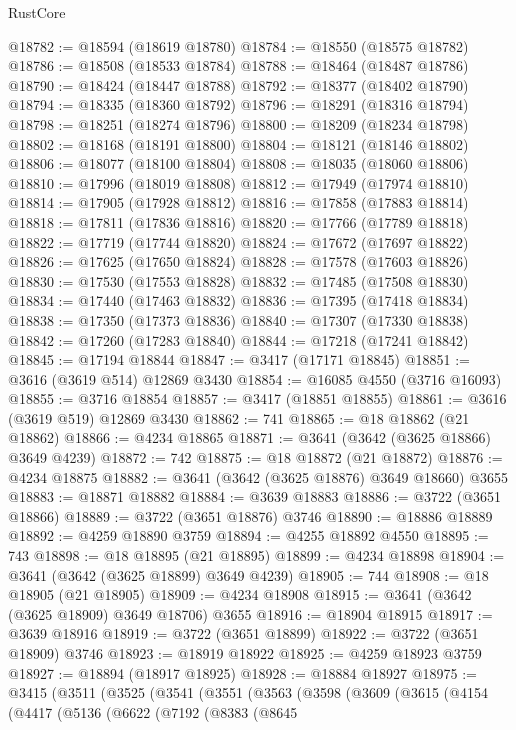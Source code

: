 \begin{lexlean}{RustCore}
\begin{coremodule}
@18782 := @18594 (@18619 @18780)
@18784 := @18550 (@18575 @18782)
@18786 := @18508 (@18533 @18784)
@18788 := @18464 (@18487 @18786)
@18790 := @18424 (@18447 @18788)
@18792 := @18377 (@18402 @18790)
@18794 := @18335 (@18360 @18792)
@18796 := @18291 (@18316 @18794)
@18798 := @18251 (@18274 @18796)
@18800 := @18209 (@18234 @18798)
@18802 := @18168 (@18191 @18800)
@18804 := @18121 (@18146 @18802)
@18806 := @18077 (@18100 @18804)
@18808 := @18035 (@18060 @18806)
@18810 := @17996 (@18019 @18808)
@18812 := @17949 (@17974 @18810)
@18814 := @17905 (@17928 @18812)
@18816 := @17858 (@17883 @18814)
@18818 := @17811 (@17836 @18816)
@18820 := @17766 (@17789 @18818)
@18822 := @17719 (@17744 @18820)
@18824 := @17672 (@17697 @18822)
@18826 := @17625 (@17650 @18824)
@18828 := @17578 (@17603 @18826)
@18830 := @17530 (@17553 @18828)
@18832 := @17485 (@17508 @18830)
@18834 := @17440 (@17463 @18832)
@18836 := @17395 (@17418 @18834)
@18838 := @17350 (@17373 @18836)
@18840 := @17307 (@17330 @18838)
@18842 := @17260 (@17283 @18840)
@18844 := @17218 (@17241 @18842)
@18845 := @17194 @18844
@18847 := @3417 (@17171 @18845)
@18851 := @3616 (@3619 @514) @12869 @3430
@18854 := @16085 @4550 (@3716 @16093)
@18855 := @3716 @18854
@18857 := @3417 (@18851 @18855)
@18861 := @3616 (@3619 @519) @12869 @3430
@18862 := 741
@18865 := @18 @18862 (@21 @18862)
@18866 := @4234 @18865
@18871 := @3641 (@3642 (@3625 @18866) @3649 @4239)
@18872 := 742
@18875 := @18 @18872 (@21 @18872)
@18876 := @4234 @18875
@18882 := @3641 (@3642 (@3625 @18876) @3649 @18660) @3655
@18883 := @18871 @18882
@18884 := @3639 @18883
@18886 := @3722 (@3651 @18866)
@18889 := @3722 (@3651 @18876) @3746
@18890 := @18886 @18889
@18892 := @4259 @18890 @3759
@18894 := @4255 @18892 @4550
@18895 := 743
@18898 := @18 @18895 (@21 @18895)
@18899 := @4234 @18898
@18904 := @3641 (@3642 (@3625 @18899) @3649 @4239)
@18905 := 744
@18908 := @18 @18905 (@21 @18905)
@18909 := @4234 @18908
@18915 := @3641 (@3642 (@3625 @18909) @3649 @18706) @3655
@18916 := @18904 @18915
@18917 := @3639 @18916
@18919 := @3722 (@3651 @18899)
@18922 := @3722 (@3651 @18909) @3746
@18923 := @18919 @18922
@18925 := @4259 @18923 @3759
@18927 := @18894 (@18917 @18925)
@18928 := @18884 @18927
@18975 := @3415
    (@3511
      (@3525
        (@3541
          (@3551
            (@3563
              (@3598
                (@3609
                  (@3615
                    (@4154
                      (@4417
                        (@5136
                          (@6622
                            (@7192
                              (@8383
                                (@8645

\end{coremodule}
\end{lexlean}
